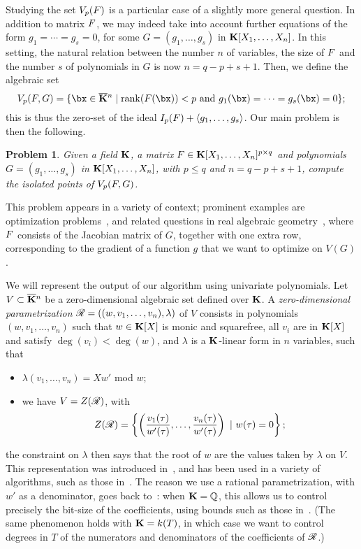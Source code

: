 \documentclass[12pt]{article}
\newtheorem{pbm}{Problem}
\begin{document}

Studying the set $V_{p}({F})$ is a particular case of a slightly
more general question. In addition to matrix ${F}$, we may indeed take
into account further equations of the form $g_1 =\cdots=g_s=0$, for
some $G=(g_1,\dots,g_s)$ in $\mathbf{K}[X_1,\dots,X_n]$. In this setting, the
natural relation between the number $n$ of variables, the size of
${F}$ and the number $s$ of polynomials in $G$ is now
$n=q-p+s+1$. Then, we define the algebraic set
$$\VpFG{p}{\mF}{G} = \{\bx \in \KKbar{}^n \mid
\mathrm{rank}(\mF({\bx})) < p \text{~and~} g_1(\bx)=\cdots=g_s(\bx)=0
\};$$ this is thus the zero-set of the ideal $I_p({F}) + \langle
g_1,\dots,g_s\rangle$.  Our main problem is then the following.
\begin{pbm} \label{problem2} 
  Given a field $\mathbf{K}$, a matrix ${F} \in \mathbf{K}[X_1,\dots,X_n]^{p \times q}$ and
  polynomials $G=(g_1,\dots,g_s)$ in $\mathbf{K}[X_1,\dots,X_n]$, with $p \leq q$ and
  $n = q-p+s+1$, compute the isolated points of $V_{p}({F},G)$.
\end{pbm}
This problem appears in a variety of context; prominent examples are
optimization problems~\cite{xxx}, and related questions in real
algebraic geometry~\cite{xxx}, where ${F}$ consists of the Jacobian
matrix of $G$, together with one extra row, corresponding to the
gradient of a function $g$ that we want to optimize on $V(G)$.

We will represent the output of our algorithm using univariate
polynomials. Let $V \subset \overline{\mathbf{K}}{}^n$ be a zero-dimensional
algebraic set defined over $\mathbf{K}$. A \emph{zero-dimensional
  parametrization} $\mathscr{R} = ((w,v_1, \ldots, v_n), \lambda)$ of $V$
consists in polynomials $(w,v_1, \ldots, v_n)$ such that $w \in
\mathbf{K}[X]$ is monic and squarefree, all $v_i$ are in $\mathbf{K}[X]$ and satisfy
$\deg(v_i) < \deg(w)$, and $\lambda$ is a $\mathbf{K}$-linear form in $n$
variables, such that
\begin{itemize}
\item $\lambda(v_1, \ldots, v_n) = Xw'$ mod $w$;
\item we have $V = Z(\mathscr{R})$, with $$Z(\mathscr{R})= \left\{\left(\frac{v_1(\tau)}{w'(\tau)}, \ldots, \frac{v_n(\tau)}{w'(\tau)}\right) \ | \ w(\tau) = 0\right\};$$
\end{itemize}
the constraint on $\lambda$ then says that the root of $w$ are the values
taken by $\lambda$ on $V$. This representation was introduced
in~\cite{Kronecker82,Macaulay16}, and has been used in a variety of
algorithms, such
as those in~\cite{GiMo89,GiHeMoPa95,ABRW,GiHeMoMoPa98,Rouillier99,GiLeSa01}.
The reason we use a rational parametrization, with $w'$ as a
denominator, goes back to~\cite{ABRW, Rouillier99, GiLeSa01}: when
$\mathbf{K}=\mathbb{Q}$, this allows us to control precisely the bit-size of the
coefficients, using bounds such as those
in~\cite{Schost03,DaSc04}. (The same phenomenon holds with $\mathbf{K}=k(T)$,
in which case we want to control degrees in $T$ of the numerators and
denominators of the coefficients of $\mathscr{R}$.)
\end{document}
